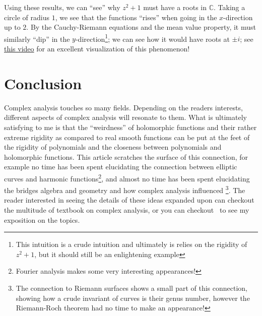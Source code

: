\documentclass[oneside]{article}
\newcommand{\C}{\mathbb{C}}
\begin{document}
Using these results, we can ``see'' why $z^2+1$ must have a roots in $\C$. Taking a circle of radius
$1$, we see that the functions ``rises'' when going in the $x$-direction up to $2$. By the Cauchy-Riemann
equations and the mean value property, it must similarly ``dip'' in the $y$-direction\footnote{This intuition
  is a crude intuition and ultimately is relies on the rigidity of $z^2+1$, but it should still be an
enlightening example}; we can see how it would have roots at $\pm i$; see
\href{https://www.youtube.com/watch?v=T647CGsuOVU}{this video} for an excellent visualization of this
phenomenon!


\section{Conclusion}

Complex analysis touches so many fields. Depending on the readers interests, different aspects of complex
analysis will resonate to them. What is ultimately satisfying to me is that the ``weirdness'' of holomorphic
functions and their rather extreme rigidity as compared to real smooth functions can be put at the feet of the
rigidity of polynomials and the closeness between polynomials and holomorphic functions. This article
scratches the surface of this connection, for example no time has been spent elucidating the connection
between elliptic curves and harmonic functions\footnote{Fourier analysis makes some very interesting
appearances!}, and almost no time has been spent elucidating the bridges
algebra and geometry and how complex analysis influenced \footnote{The connection to Riemann surfaces shows a
  small part of this connection, showing how a crude invariant of curves is their genus number, however the
Riemann-Roch theorem had no time to make an appearance!}. The reader interested in seeing the details of these
ideas expanded upon can checkout the multitude of textbook on complex analysis, or you can
checkout~\cite{NateComplexAnalysis} to see my exposition on the topics.




\end{document}
